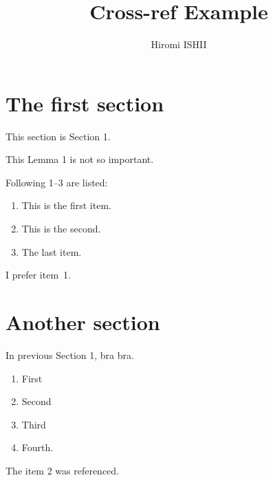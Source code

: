 \documentclass[a4paper]{article}
\title{Cross-ref Example}
\author{Hiromi ISHII}
\begin{document}
\maketitle

\section{The first section}

This section is Section 1.

\begin{lemma}
 This Lemma 1 is not so important.
\end{lemma}

Following 1--3 are listed:
\begin{enumerate}
 \item  This is the first item.
 \item This is the second.
 \item  The last item.
\end{enumerate}

I prefer item~1.

\section{Another section}

In previous Section 1, bra bra.

\begin{enumerate}
 \item First
 \item Second
 \item Third
 \item Fourth.
\end{enumerate}

The item 2 was referenced.
\end{document}
